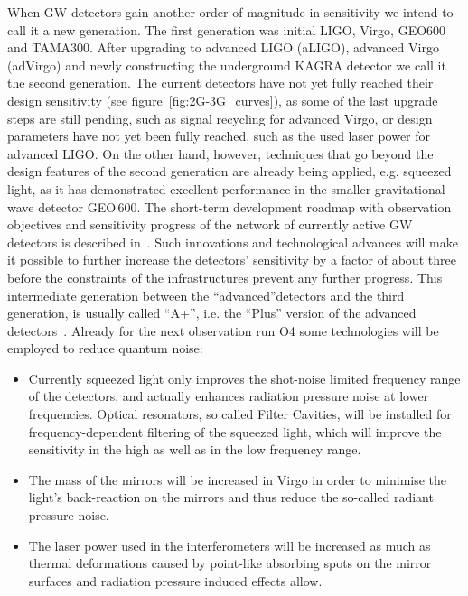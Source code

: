 \documentclass[graybox, nosecnum]{svmult}
\begin{document}
When GW detectors gain another order of magnitude in sensitivity we intend to call it a new generation. The first generation was initial LIGO, Virgo, GEO600 and TAMA300. After upgrading to advanced LIGO (aLIGO), advanced Virgo (adVirgo) and newly constructing the underground KAGRA detector we call it the second generation. The current detectors have not yet fully reached their design sensitivity (see figure~\ref{fig:2G-3G_curves}), as some of the last upgrade steps are still pending, such as signal recycling for advanced Virgo, or design parameters have not yet been fully reached, such as the used laser power for advanced LIGO. On the other hand, however, techniques that go beyond the design features of the second generation are already being applied, e.g. squeezed light, as it has demonstrated excellent performance in the smaller gravitational wave detector GEO\,600. The short-term development roadmap with observation objectives and sensitivity progress of the network of currently active GW detectors is described in~\cite{ObservingScenarios}.
Such innovations and technological advances will make it possible to further increase the detectors' sensitivity by a factor of about three before the constraints of the infrastructures prevent any further progress. This intermediate generation between the ``advanced''detectors and the third generation, is usually called ``A+'', i.e. the ``Plus'' version of the advanced detectors~\cite{VirgoAPlus,LIGOA+}. Already for the next observation run O4 some technologies will be employed to reduce quantum noise: 
\begin{itemize}
    \item Currently squeezed light only improves the shot-noise limited frequency range of the detectors, and actually enhances radiation pressure noise at lower frequencies. Optical resonators, so called Filter Cavities, will be installed for frequency-dependent filtering of the squeezed light, which will improve the sensitivity in the high as well as in the low frequency range.
    \item The mass of the mirrors will be increased in Virgo in order to minimise the light's back-reaction on the mirrors and thus reduce the so-called radiant pressure noise. 
    \item The laser power used in the interferometers will be increased as much as thermal deformations caused by point-like absorbing spots on the mirror surfaces and radiation pressure induced effects allow. 
\end{itemize} 
\end{document}
